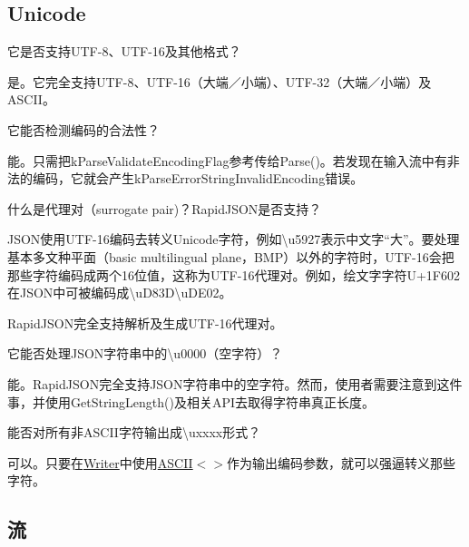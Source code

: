 \subsection*{Unicode}


\begin{DoxyEnumerate}
\item 它是否支持\+U\+T\+F-\/8、\+U\+T\+F-\/16及其他格式？

是。它完全支持\+U\+T\+F-\/8、\+U\+T\+F-\/16（大端／小端）、\+U\+T\+F-\/32（大端／小端）及\+A\+S\+C\+I\+I。
\item 它能否检测编码的合法性？

能。只需把{\ttfamily k\+Parse\+Validate\+Encoding\+Flag}参考传给{\ttfamily Parse()}。若发现在输入流中有非法的编码，它就会产生{\ttfamily k\+Parse\+Error\+String\+Invalid\+Encoding}错误。
\item 什么是代理对（surrogate pair)？\+Rapid\+J\+S\+O\+N是否支持？

J\+S\+O\+N使用\+U\+T\+F-\/16编码去转义\+Unicode字符，例如{\ttfamily \textbackslash{}u5927}表示中文字“大”。要处理基本多文种平面（basic multilingual plane，\+B\+M\+P）以外的字符时，\+U\+T\+F-\/16会把那些字符编码成两个16位值，这称为\+U\+T\+F-\/16代理对。例如，绘文字字符\+U+1\+F602在\+J\+S\+O\+N中可被编码成{\ttfamily \textbackslash{}u\+D83D\textbackslash{}u\+D\+E02}。

Rapid\+J\+S\+O\+N完全支持解析及生成\+U\+T\+F-\/16代理对。
\item 它能否处理\+J\+S\+O\+N字符串中的{\ttfamily \textbackslash{}u0000}（空字符）？

能。\+Rapid\+J\+S\+O\+N完全支持\+J\+S\+O\+N字符串中的空字符。然而，使用者需要注意到这件事，并使用{\ttfamily Get\+String\+Length()}及相关\+A\+P\+I去取得字符串真正长度。
\item 能否对所有非\+A\+S\+C\+I\+I字符输出成{\ttfamily \textbackslash{}uxxxx}形式？

可以。只要在{\ttfamily \hyperlink{class_writer}{Writer}}中使用{\ttfamily \hyperlink{struct_a_s_c_i_i}{A\+S\+C\+II}$<$$>$}作为输出编码参数，就可以强逼转义那些字符。
\end{DoxyEnumerate}

\subsection*{流}


